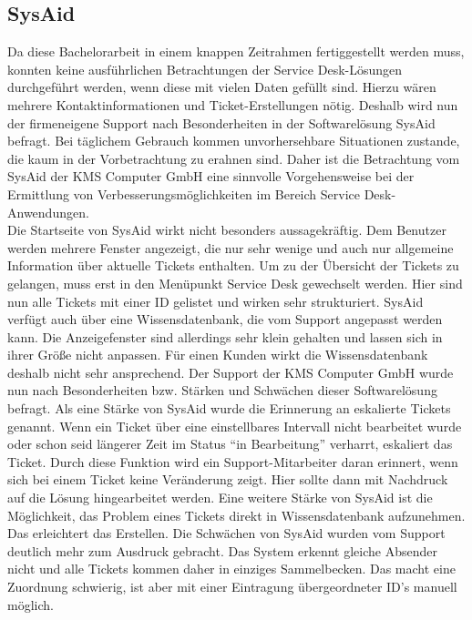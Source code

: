 \subsection{SysAid}
\noindent
Da diese Bachelorarbeit in einem knappen Zeitrahmen fertiggestellt werden muss, konnten keine ausführlichen Betrachtungen der Service Desk-Lösungen durchgeführt werden, wenn diese mit vielen Daten gefüllt sind. Hierzu wären mehrere Kontaktinformationen und Ticket-Erstellungen nötig. Deshalb wird nun der firmeneigene Support nach Besonderheiten in der Softwarelösung SysAid befragt. Bei täglichem Gebrauch kommen unvorhersehbare Situationen zustande, die kaum in der Vorbetrachtung zu erahnen sind. Daher ist die Betrachtung vom SysAid der KMS Computer GmbH eine sinnvolle Vorgehensweise bei der Ermittlung von Verbesserungsmöglichkeiten im Bereich Service Desk-Anwendungen.\\
\noindent
Die Startseite von SysAid wirkt nicht besonders aussagekräftig. Dem Benutzer werden mehrere Fenster angezeigt, die nur sehr wenige und auch nur allgemeine Information über aktuelle Tickets enthalten. Um zu der Übersicht der Tickets zu gelangen, muss erst in den Menüpunkt Service Desk gewechselt werden. Hier sind nun alle Tickets mit einer ID gelistet und wirken sehr strukturiert. \newline
SysAid verfügt auch über eine Wissensdatenbank, die vom Support angepasst werden kann. Die Anzeigefenster sind allerdings sehr klein gehalten und lassen sich in ihrer Größe nicht anpassen. Für einen Kunden wirkt die Wissensdatenbank deshalb nicht sehr ansprechend.\newline
Der Support der KMS Computer GmbH wurde nun nach Besonderheiten bzw. Stärken und Schwächen dieser Softwarelösung befragt. Als eine Stärke von SysAid wurde die Erinnerung an eskalierte Tickets genannt. Wenn ein Ticket über eine einstellbares Intervall  nicht bearbeitet wurde oder schon seid längerer Zeit im Status \enquote{in Bearbeitung} verharrt, eskaliert das Ticket.\newline
Durch diese Funktion wird ein Support-Mitarbeiter daran erinnert, wenn sich bei einem Ticket keine Veränderung zeigt. Hier sollte dann mit Nachdruck auf die Lösung hingearbeitet werden. Eine weitere Stärke von SysAid ist die Möglichkeit, das Problem eines Tickets direkt in Wissensdatenbank aufzunehmen. Das erleichtert das Erstellen. \newline
Die Schwächen  von SysAid wurden vom Support deutlich mehr zum Ausdruck gebracht. Das System erkennt  gleiche Absender nicht und alle Tickets kommen daher in einziges Sammelbecken. Das macht eine Zuordnung schwierig, ist aber mit einer Eintragung übergeordneter ID's manuell möglich.\newline
